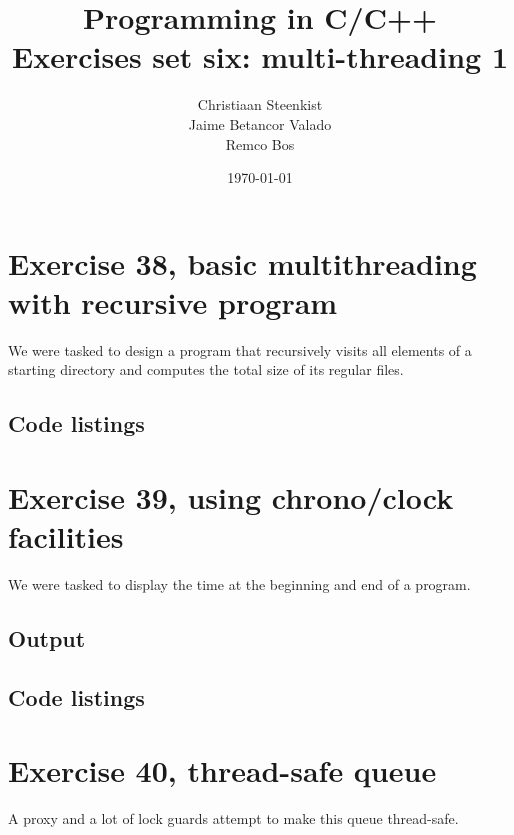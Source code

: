 \documentclass[11pt]{article}
\begin{document}
\title{Programming in C/C++ \\
       Exercises set six: multi-threading 1
}
\date{\today}
\author{Christiaan Steenkist \\
Jaime Betancor Valado \\
Remco Bos \\
}

\maketitle
\section*{Exercise 38, basic multithreading with recursive program}
We were tasked to design a program that recursively visits all elements of a starting directory and computes the total size of its regular files.

\subsection*{Code listings}





\section*{Exercise 39, using chrono/clock facilities }
We were tasked to display the time at the beginning and end of a program.

\subsection*{Output}


\subsection*{Code listings}


\section*{Exercise 40, thread-safe queue}
A proxy and a lot of lock guards attempt to make this queue thread-safe.
\end{document}
